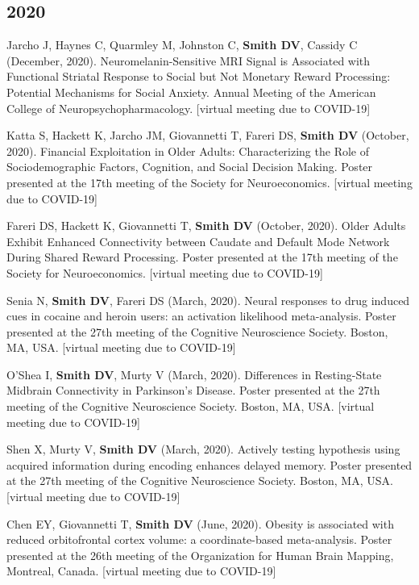 \documentclass[11pt, letterpaper]{article}
\begin{document}
\subsection*{2020}
\begin{hangparas}{.5in}{1}

Jarcho J, Haynes C, Quarmley M, Johnston C, \textbf{Smith DV}, Cassidy C (December, 2020). Neuromelanin-Sensitive MRI Signal is Associated with Functional Striatal Response to Social but Not Monetary Reward Processing: Potential Mechanisms for Social Anxiety. Annual Meeting of the American College of Neuropsychopharmacology. [virtual meeting due to COVID-19]

Katta S, Hackett K, Jarcho JM, Giovannetti T, Fareri DS, \textbf{Smith DV} (October, 2020). Financial Exploitation in Older Adults: Characterizing the Role of Sociodemographic Factors, Cognition, and Social Decision Making. Poster presented at the 17th meeting of the Society for Neuroeconomics. [virtual meeting due to COVID-19]

Fareri DS, Hackett K, Giovannetti T, \textbf{Smith DV} (October, 2020). Older Adults Exhibit Enhanced Connectivity between Caudate and Default Mode Network During Shared Reward Processing. Poster presented at the 17th meeting of the Society for Neuroeconomics. [virtual meeting due to COVID-19]

Senia N, \textbf{Smith DV}, Fareri DS (March, 2020). Neural responses to drug induced cues in cocaine and heroin users: an activation likelihood meta-analysis. Poster presented at the 27th meeting of the Cognitive Neuroscience Society. Boston, MA, USA. [virtual meeting due to COVID-19]

O'Shea I, \textbf{Smith DV}, Murty V (March, 2020). Differences in Resting-State Midbrain Connectivity in Parkinson’s Disease. Poster presented at the 27th meeting of the Cognitive Neuroscience Society. Boston, MA, USA. [virtual meeting due to COVID-19]

Shen X, Murty V, \textbf{Smith DV} (March, 2020). Actively testing hypothesis using acquired information during encoding enhances delayed memory. Poster presented at the 27th meeting of the Cognitive Neuroscience Society. Boston, MA, USA. [virtual meeting due to COVID-19]

Chen EY, Giovannetti T, \textbf{Smith DV} (June, 2020). Obesity is associated with reduced orbitofrontal cortex volume: a coordinate-based meta-analysis. Poster presented at the 26th meeting of the Organization for Human Brain Mapping, Montreal, Canada. [virtual meeting due to COVID-19] \\

\end{hangparas}
\end{document}

